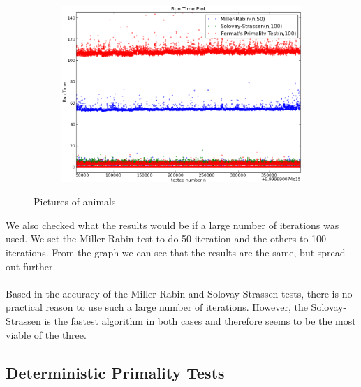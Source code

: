 \documentclass[compressed,final,notitlepage,narroweqnarray,inline,twoside,]{ieee}
\begin{document}
\begin{figure}[H]
        \centering
        \begin{subfigure}[b]{0.5\textwidth}
                \includegraphics[width=\textwidth]{../images/all_singlethread_runtime}
                \label{fig:gull}
        \end{subfigure}
        \caption{Pictures of animals}\label{fig:animals}
\end{figure}
We also checked what the results would be if a large number of iterations was used. We set the Miller-Rabin test to do 50 iteration and the others to 100 iterations. From the graph we can see that the results are the same, but spread out further.\\\\ Based in the accuracy of the Miller-Rabin and Solovay-Strassen tests, there is no practical reason to use such a large number of iterations. However, the Solovay-Strassen is the fastest algorithm in both cases and therefore seems to be the most viable of the three.
\subsection{Deterministic Primality Tests}
\end{document}
